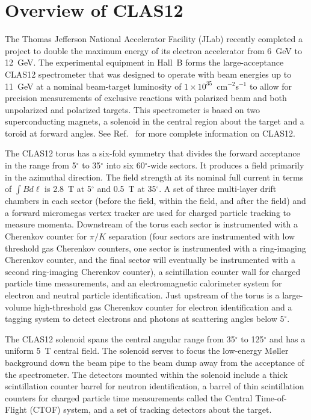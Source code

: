 \documentclass{elsart}
\begin{document}
\newpage
\section{Overview of CLAS12}

The Thomas Jefferson National Accelerator Facility (JLab) recently completed a project to 
double the maximum energy of its electron accelerator from 6~GeV to 12~GeV. The experimental 
equipment in Hall~B forms the large-acceptance CLAS12 spectrometer that was designed to operate 
with beam energies up to 11~GeV at a nominal beam-target luminosity of 
$1 \times 10^{35}$~cm$^{-2}$s$^{-1}$ to allow for precision measurements of exclusive 
reactions with polarized beam and both unpolarized and polarized targets. This spectrometer is 
based on two superconducting magnets, a solenoid in the central region about the target and a 
toroid at forward angles. See Ref.~\cite{overview-ref} for more complete information on CLAS12.

The CLAS12 torus has a six-fold symmetry that divides the forward acceptance in the range from
5$^\circ$ to 35$^\circ$ into six 60$^\circ$-wide sectors. It produces a field primarily in the 
azimuthal direction. The field strength at its nominal full current in terms of 
$\int \!B d\ell$ is 2.8~T at 5$^\circ$ and 0.5~T at 35$^\circ$. A set of three multi-layer drift 
chambers in each sector (before the field, within the field, and after the field) and a forward
micromegas vertex tracker are used for charged particle tracking to measure momenta. Downstream 
of the torus each sector is instrumented with a Cherenkov counter for $\pi/K$ separation (four 
sectors are instrumented with low threshold gas Cherenkov counters, one sector is instrumented 
with a ring-imaging Cherenkov counter, and the final sector will eventually be instrumented with a
second ring-imaging Cherenkov counter), a scintillation counter wall for charged particle time
measurements, and an electromagnetic calorimeter system for electron and neutral particle 
identification. Just upstream of the torus is a large-volume high-threshold gas Cherenkov counter 
for electron identification and a tagging system to detect electrons and photons at scattering 
angles below $5^\circ$.

The CLAS12 solenoid spans the central angular range from 35$^\circ$ to 125$^\circ$ and has a 
uniform 5~T central field. The solenoid serves to focus the low-energy M{\o}ller background down 
the beam pipe to the beam dump away from the acceptance of the spectrometer. The detectors
mounted within the solenoid include a thick scintillation counter barrel for neutron identification, a
barrel of thin scintillation counters for charged particle time measurements called the Central 
Time-of-Flight (CTOF) system, and a set of tracking detectors about the target.
\end{document}
